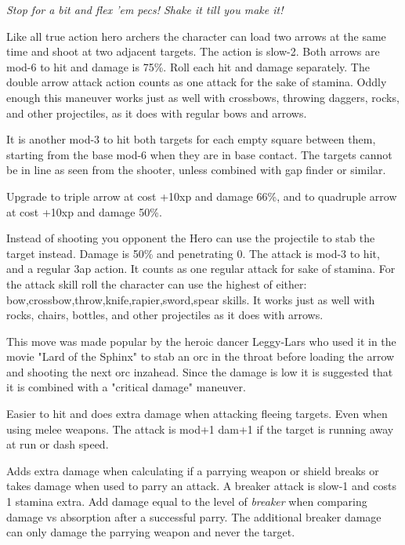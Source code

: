 \noindent \emph{Stop for a bit and flex 'em pecs! Shake it till you make it!}


 Like all true action hero archers the character can load two arrows at the same time and shoot at two adjacent targets. The action is slow-2. Both arrows are mod-6 to hit and damage is 75\%. Roll each hit and damage separately. The double arrow attack action counts as one attack for the sake of stamina. 
Oddly enough this maneuver works just as well with crossbows, throwing daggers, rocks, and other projectiles, as it does with regular bows and arrows.

It is another mod-3 to hit both targets for each empty square between them, starting from the base mod-6 when they are in base contact. The targets cannot be in line as seen from the shooter, unless combined with gap finder or similar.

Upgrade to triple arrow at cost +10xp and damage 66\%, and to quadruple arrow at cost +10xp and damage 50\%.


 Instead of shooting you opponent the Hero can use the projectile to stab the target instead. Damage is 50\% and penetrating 0. The attack is mod-3 to hit, and a regular 3ap action. It counts as one regular attack for sake of stamina. For the attack skill roll the character can use the highest of either: bow,crossbow,throw,knife,rapier,sword,spear skills.
It works just as well with rocks, chairs, bottles, and other projectiles as it does with arrows.

This move was made popular by the heroic dancer Leggy-Lars who used it in the movie "Lard of the Sphinx" to stab an orc in the throat before loading the arrow and shooting the next orc inzahead. Since the damage is low it is suggested that it is combined with a "critical damage" maneuver.


 Easier to hit and does extra damage when attacking fleeing targets. Even when using melee weapons. The attack is mod+1 dam+1 if the target is running away at run or dash speed.


 Adds extra damage when calculating if a parrying weapon or shield breaks or takes damage when used to parry an attack. A breaker attack is slow-1 and costs 1 stamina extra. Add damage equal to the level of \emph{breaker} when comparing damage vs absorption after a successful parry. The additional breaker damage can only damage the parrying weapon and never the target.

